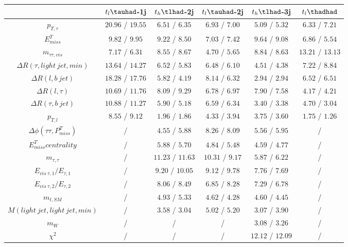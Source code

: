 \centering
\begin{tabular}{|c|c|c|c|c|c|} \hline
 & $t_{l}\tauhad$-1j & $t_{h}\tlhad$-2j & $t_{l}\tauhad$-2j & $t_{h}\tlhad$-3j & $t_l\thadhad$\\\hline
$p_{T,\tau }$ & $20.96$ / $19.55$ & $6.51$ / $6.35$ & $6.93$ / $7.00$ & $5.09$ / $5.32$ & $6.33$ / $7.21$\\\hline
$E^{T}_{miss}$ & $9.82$ / $9.95$ & $9.22$ / $8.50$ & $7.03$ / $7.42$ & $9.64$ / $9.08$ & $6.86$ / $5.54$\\\hline
$m_{\tau \tau ,vis}$ & $7.17$ / $6.31$ & $8.55$ / $8.67$ & $4.70$ / $5.65$ & $8.84$ / $8.63$ & $13.21$ / $13.13$\\\hline
$\Delta R(\tau ,light~jet,min)$ & $13.64$ / $14.27$ & $6.52$ / $5.83$ & $6.48$ / $6.10$ & $4.51$ / $4.38$ & $7.22$ / $8.84$\\\hline
$\Delta R(l,b~jet)$ & $18.28$ / $17.76$ & $5.82$ / $4.19$ & $8.14$ / $6.32$ & $2.94$ / $2.94$ & $6.52$ / $6.51$\\\hline
$\Delta R(l,\tau )$ & $10.69$ / $11.76$ & $8.09$ / $9.29$ & $6.78$ / $6.97$ & $7.90$ / $7.58$ & $4.17$ / $4.21$\\\hline
$\Delta R(\tau ,b~jet)$ & $10.88$ / $11.27$ & $5.90$ / $5.18$ & $6.59$ / $6.34$ & $3.40$ / $3.38$ & $4.70$ / $3.04$\\\hline
$p_{T,l}$ & $8.55$ / $9.12$ & $1.96$ / $1.86$ & $4.33$ / $3.94$ & $3.75$ / $3.60$ & $1.75$ / $1.26$\\\hline
$\Delta\phi(\tau \tau ,P^{T}_{miss})$ &  / & $4.55$ / $5.88$ & $8.26$ / $8.09$ & $5.56$ / $5.95$ &  /\\\hline
$E^{T}_{miss} centrality$ &  / & $5.88$ / $5.70$ & $4.84$ / $5.48$ & $4.59$ / $4.77$ &  /\\\hline
$m_{\tau ,\tau }$ &  / & $11.23$ / $11.63$ & $10.31$ / $9.17$ & $5.87$ / $6.22$ &  /\\\hline
$E_{vis~\tau ,1}/E_{\tau ,1}$ &  / & $9.20$ / $10.05$ & $9.12$ / $9.78$ & $7.76$ / $7.69$ &  /\\\hline
$E_{vis~\tau ,2}/E_{\tau ,2}$ &  / & $8.06$ / $8.49$ & $6.85$ / $8.28$ & $7.29$ / $6.78$ &  /\\\hline
$m_{t,SM}$ &  / & $4.93$ / $5.33$ & $4.62$ / $4.28$ & $4.60$ / $4.45$ &  /\\\hline
$M(light~jet,light~jet,min)$ &  / & $3.58$ / $3.04$ & $5.02$ / $5.20$ & $3.07$ / $3.90$ &  /\\\hline
$m_{W}$ &  / &  / &  / & $3.08$ / $3.26$ &  /\\\hline
$\chi^{2}$ &  / &  / &  / & $12.12$ / $12.09$ &  /\\\hline

\end{tabular}

